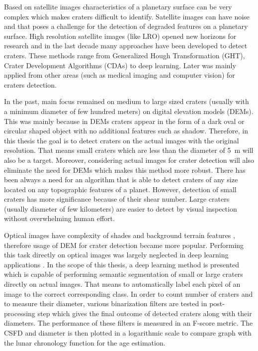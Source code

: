 \documentclass[11pt]{article}
\begin{document}
Based on satellite images characteristics of a planetary surface can be very complex which makes craters difficult to identify. Satellite images can have noise and that poses a challenge for the detection of degraded features on a planetary surface. High resolution satellite images (like LRO) opened new horizons for research and in the last decade many approaches have been developed to detect craters. These methods range from Generalized Hough Transformation (GHT), Crater Development Algorithms (CDAs) to deep learning. Later was mainly applied from other areas (such as medical imaging and computer vision) for craters detection. 

In the past, main focus remained on medium to large sized craters (usually with a minimum diameter of few hundred meters) on digital elevation models (DEMs). This was mainly because in DEMs craters appear in the form of a dark oval or circular shaped object with no additional features such as shadow. Therefore, in this thesis the goal is to detect craters on the actual images with the original resolution. That means small craters which are less than the diameter of \SI{5}{\metre} will also be a target. Moreover, considering actual images for crater detection will also eliminate the need for DEMs which makes this method more robust. There has been always a need for an algorithm that is able to detect craters of any size located on any topographic features of a planet. However, detection of small craters has more significance because of their shear number. Large craters (usually diameter of few kilometers) are easier to detect by visual inspection without overwhelming human effort.

Optical images have complexity of shades and background terrain features \cite{ali2019automated}, therefore usage of DEM for crater detection became more popular. Performing this task directly on optical images was largely neglected in deep learning applications \cite{finkelsteinautomatic}. In the scope of this thesis, a deep learning method is presented which is capable of performing semantic segmentation of small or large craters directly on actual images. That means to automatically label each pixel of an image to the correct corresponding class. In order to count number of craters and to measure their diameter, various binarization filters are tested in post-processing step which gives the final outcome of detected craters along with their diameters.  The performance of these filters is measured in an F-score metric. The CSFD and diameter is then plotted in a logarithmic scale to compare graph with the lunar chronology function for the age estimation. 
\end{document}
